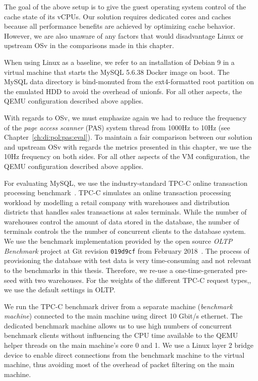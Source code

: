 \documentclass[12pt,a4paper]{book}
\begin{document}
The goal of the above setup is to give the guest operating system control of the cache state of its vCPUs.
Our solution requires dedicated cores and caches because all performance benefits are achieved by optimizing cache behavior.
However, we are also unaware of any factors that would disadvantage Linux or upstream OSv in the comparisons made in this chapter.

When using Linux as a baseline, we refer to an installation of Debian 9 in a virtual machine that starts the MySQL 5.6.38 Docker image on boot.
The MySQL data directory is bind-monuted from the ext4-formatted root partition on the emulated HDD to avoid the overhead of unionfs.
For all other aspects, the QEMU configuration described above applies.

With regards to OSv, we must emphasize again we had to reduce the frequency of the \emph{page access scanner} (PAS) system thread from 1000Hz to 10Hz (see Chapter~\ref{ch:di:pol:pas:eval}).
To maintain a fair comparison between our solution and upstream OSv with regards the metrics presented in this chapter, we use the 10Hz frequency on both sides.
For all other aspects of the VM configuration, the QEMU configuration described above applies.

For evaluating MySQL, we use the industry-standard TPC-C online transaction processing benchmark~\cite{tpccSpec}.
TPC-C simulates an online transaction processing workload by modelling a retail company with warehouses and distribution districts that handles sales transactions at sales terminals.
While the number of warehouses control the amount of data stored in the database, the number of terminals controls the the number of concurrent clients to the database system.
We use the benchmark implementation provided by the open source \emph{OLTP Benchmark} project at Git revision \texttt{019d9cf} from February 2018~\cite{oltpbench}.
The process of provisioning the database with test data is very time-consuming and not relevant to the benchmarks in this thesis.
Therefore, we re-use a one-time-generated pre-seed with two warehouses.
For the weights of the different TPC-C request types,, we use the default settings in OLTP.

We run the TPC-C benchmark driver from a separate machine (\emph{benchmark machine}) connected to the main machine using direct 10 Gbit/s ethernet.
The dedicated benchmark machine allows us to use high numbers of concurrent benchmark clients without influencing the CPU time available to the QEMU helper threads on the main machine's core 0 and 1.
We use a Linux layer 2 bridge device to enable direct connections from the benchmark machine to the virtual machine, thus avoiding most of the overhead of packet filtering on the main machine.
\end{document}
